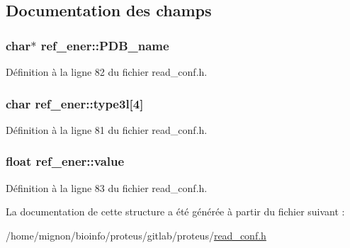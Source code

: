 \subsection{Documentation des champs}
\hypertarget{structref__ener_a044c52971d7c36e9bf532a6cbe27efa5}{
\subsubsection[{P\+D\+B\+\_\+name}]{\setlength{\rightskip}{0pt plus 5cm}char$\ast$ ref\+\_\+ener\+::\+P\+D\+B\+\_\+name}}\label{structref__ener_a044c52971d7c36e9bf532a6cbe27efa5}


Définition à la ligne 82 du fichier read\+\_\+conf.\+h.

\hypertarget{structref__ener_a0be7a83f7ea09b93f426425b14bc44d1}{
\subsubsection[{type3l}]{\setlength{\rightskip}{0pt plus 5cm}char ref\+\_\+ener\+::type3l\mbox{[}4\mbox{]}}}\label{structref__ener_a0be7a83f7ea09b93f426425b14bc44d1}


Définition à la ligne 81 du fichier read\+\_\+conf.\+h.

\hypertarget{structref__ener_a53197ad188efb30815d326df7eb6f746}{
\subsubsection[{value}]{\setlength{\rightskip}{0pt plus 5cm}float ref\+\_\+ener\+::value}}\label{structref__ener_a53197ad188efb30815d326df7eb6f746}


Définition à la ligne 83 du fichier read\+\_\+conf.\+h.



La documentation de cette structure a été générée à partir du fichier suivant \+:\begin{DoxyCompactItemize}
\item 
/home/mignon/bioinfo/proteus/gitlab/proteus/\hyperlink{read__conf_8h}{read\+\_\+conf.\+h}\end{DoxyCompactItemize}
